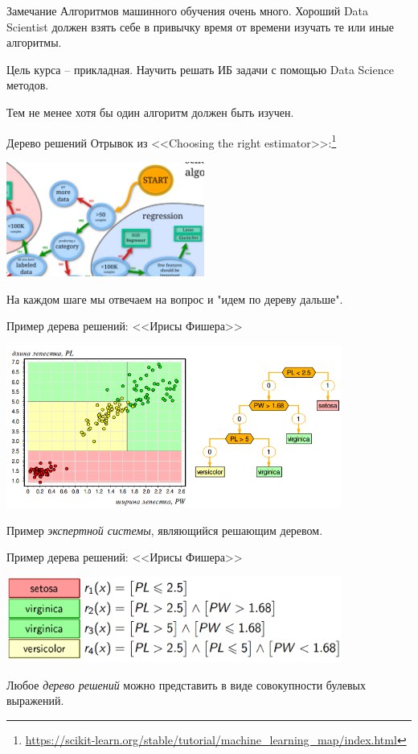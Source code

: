 \documentclass{beamer}
\newcommand{\term}{\textit}
\begin{document}
\begin{frame}
\begin{block}{Замечание}
	Алгоритмов машинного обучения очень много. 
	Хороший Data Scientist должен взять себе в привычку
	время от времени изучать те или иные алгоритмы.
	
	Цель курса -- прикладная. Научить решать ИБ задачи с помощью
	Data Science методов.
	
	Тем не менее хотя бы один алгоритм должен быть изучен.
\end{block}
\end{frame}

\begin{frame}{Дерево решений}
	Отрывок из <<Choosing the right estimator>>:\footnote{\tiny \url{https://scikit-learn.org/stable/tutorial/machine_learning_map/index.html}}
	\begin{center}
	\includegraphics[width=6.5cm]{../pic/scikit_desicion_tree.png}\centering
	\end{center}
	На каждом шаге мы отвечаем на вопрос и "идем по дереву дальше".
\end{frame}

\begin{frame}{Пример дерева решений: <<Ирисы Фишера>>}
	\begin{center}
	\includegraphics[width=11cm]{../pic/fisher_iris_tree.png}
	\end{center}
	Пример \term{экспертной системы}, являющийся решающим деревом.
\end{frame}

\begin{frame}{Пример дерева решений: <<Ирисы Фишера>>}
	\begin{center}
	\includegraphics[width=11cm]{../pic/fisher_iris_boolean.png}
	\end{center}
	
	Любое \term{дерево решений} можно представить в виде совокупности
	булевых выражений.
\end{frame}
\end{document}
